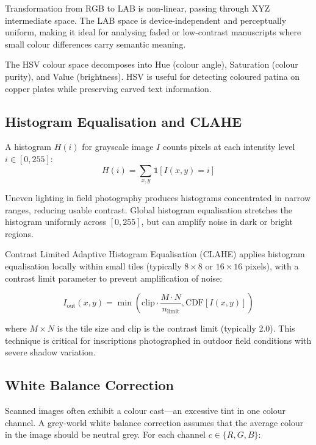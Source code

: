 Transformation from RGB to LAB is non-linear, passing through XYZ intermediate space. The LAB space is device-independent and perceptually uniform, making it ideal for analysing faded or low-contrast manuscripts where small colour differences carry semantic meaning.

The HSV colour space decomposes into Hue (colour angle), Saturation (colour purity), and Value (brightness). HSV is useful for detecting coloured patina on copper plates while preserving carved text information.

\subsection{Histogram Equalisation and CLAHE}\label{sec:clahe}

A histogram $H(i)$ for grayscale image $I$ counts pixels at each intensity level $i \in [0, 255]$:
\begin{equation}
H(i) = \sum_{x,y} \mathbb{1}[I(x,y) = i]
\end{equation}

Uneven lighting in field photography produces histograms concentrated in narrow ranges, reducing usable contrast. Global histogram equalisation stretches the histogram uniformly across $[0, 255]$, but can amplify noise in dark or bright regions.

Contrast Limited Adaptive Histogram Equalisation (CLAHE) applies histogram equalisation locally within small tiles (typically $8 \times 8$ or $16 \times 16$ pixels), with a contrast limit parameter to prevent amplification of noise:

\begin{equation}
I_{\text{out}}(x,y) = \min\left(\text{clip} \cdot \frac{M \cdot N}{n_{\text{limit}}}, \text{CDF}[I(x,y)]\right)
\end{equation}

where $M \times N$ is the tile size and $\text{clip}$ is the contrast limit (typically 2.0). This technique is critical for inscriptions photographed in outdoor field conditions with severe shadow variation.

\subsection{White Balance Correction}

Scanned images often exhibit a colour cast—an excessive tint in one colour channel. A grey-world white balance correction assumes that the average colour in the image should be neutral grey. For each channel $c \in \{R, G, B\}$:

